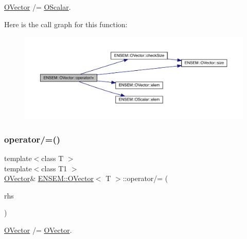 \mbox{\hyperlink{classENSEM_1_1OVector}{O\+Vector}} /= \mbox{\hyperlink{classENSEM_1_1OScalar}{O\+Scalar}}. 

Here is the call graph for this function\+:
\nopagebreak
\begin{figure}[H]
\begin{center}
\leavevmode
\includegraphics[width=350pt]{d0/d8d/classENSEM_1_1OVector_aa26be39a0620d0cdc1685bc2f1cc31a5_cgraph}
\end{center}
\end{figure}
\mbox{\label{classENSEM_1_1OVector_a61d1911393adf46629dd493ef09c1022}} 
\subsubsection{\texorpdfstring{operator/=()}{operator/=()}\hspace{0.1cm}{\footnotesize\ttfamily [3/4]}}
{\footnotesize\ttfamily template$<$class T $>$ \\
template$<$class T1 $>$ \\
\mbox{\hyperlink{classENSEM_1_1OVector}{O\+Vector}}\& \mbox{\hyperlink{classENSEM_1_1OVector}{E\+N\+S\+E\+M\+::\+O\+Vector}}$<$ T $>$\+::operator/= (\begin{DoxyParamCaption}\item[{const \mbox{\hyperlink{classENSEM_1_1OVector}{O\+Vector}}$<$ T1 $>$ \&}]{rhs }\end{DoxyParamCaption})\hspace{0.3cm}{\ttfamily [inline]}}



\mbox{\hyperlink{classENSEM_1_1OVector}{O\+Vector}} /= \mbox{\hyperlink{classENSEM_1_1OVector}{O\+Vector}}. 

